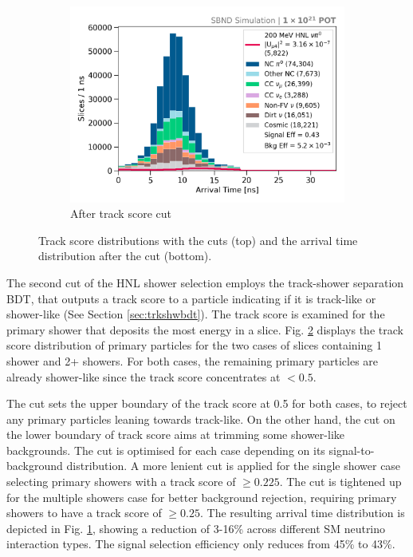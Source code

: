 \begin{figure}[ht!]
\begin{subfigure}[b]{0.495\textwidth}
            \includegraphics[width=\textwidth]{beam_bucket_postrackscore}
            \caption{After track score cut}%
	    \label{fig:bb_track_score}
        \end{subfigure}
	\caption[Track Score Cut]{
		Track score distributions with the cuts (top) and the arrival time distribution after the cut (bottom). 
	}
        \label{fig:track_score_cut}
\end{figure}

The second cut of the HNL shower selection employs the track-shower separation BDT, that outputs a track score to a particle indicating if it is track-like or shower-like (See Section \ref{sec:trkshwbdt}).
The track score is  examined for the primary shower that deposits the most energy in a slice.  
Fig. \ref{fig:track_score_cut} displays the track score distribution of primary particles for the two cases of slices containing 1 shower and 2+ showers.
For both cases, the remaining primary particles are already shower-like since the track score concentrates at $< 0.5$.

The cut sets the upper boundary of the track score at 0.5 for both cases, to reject any primary particles leaning towards track-like.
On the other hand, the cut on the lower boundary of track score aims at trimming some shower-like backgrounds.
The cut is optimised for each case depending on its signal-to-background distribution.
A more lenient cut is applied for the single shower case selecting primary showers with a track score of $\geq 0.225$.
The cut is tightened up for the multiple showers case for better background rejection, requiring primary showers to have a track score of $\geq 0.25$.
The resulting arrival time distribution is depicted in Fig. \ref{fig:bb_track_score}, showing a reduction of 3-16\% across different SM neutrino interaction types.
The signal selection efficiency only reduces from 45\% to 43\%.

